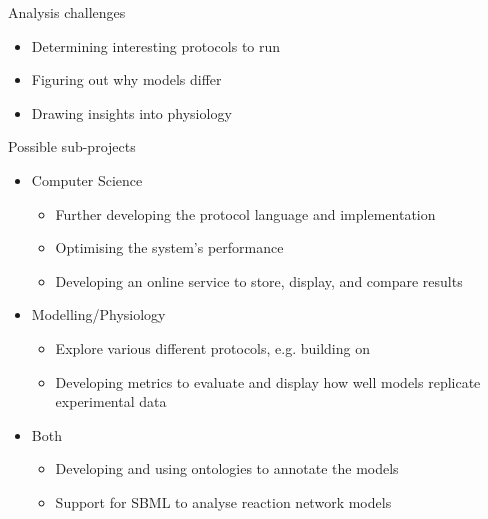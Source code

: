 \documentclass[t,xcolor={usenames,dvipsnames}]{beamer}
\begin{document}
\begin{frame}{Analysis challenges}
\begin{itemize}
\item Determining interesting protocols to run
\item Figuring out why models differ %
\item Drawing insights into physiology
\end{itemize}
\end{frame}

\begin{frame}{Possible sub-projects}
\begin{itemize}
\item Computer Science
  \begin{itemize}
  \item Further developing the protocol language and implementation
  \item Optimising the system's performance
  \item Developing an online service to store, display, and compare results
  \end{itemize}
\item Modelling/Physiology
  \begin{itemize}
  \item Explore various different protocols, e.g. building on \citet{Romero*.09:Impact}
  \item Developing metrics to evaluate and display how well models replicate experimental data
  \end{itemize}
\item Both
  \begin{itemize}
  \item Developing and using ontologies to annotate the models
  \item Support for SBML to analyse reaction network models
  \end{itemize}
\end{itemize}
\end{frame}



\end{document}
